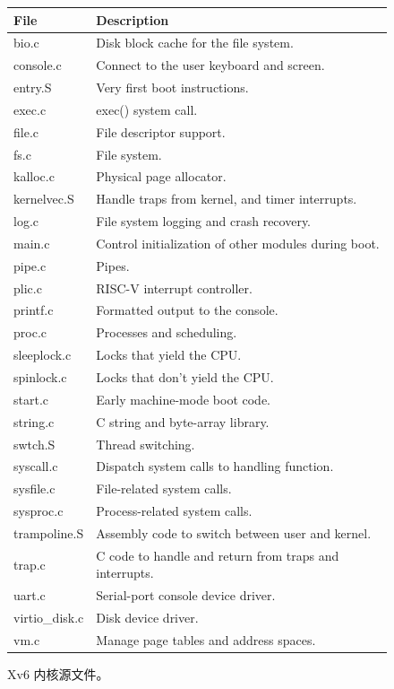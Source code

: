    \begin{figure}[t]
\center
\begin{tabular}{l|l}
{\bf File} & {\bf Description}  \\ 
\midrule bio.c & Disk block cache for the file system.  \\ console.c & Connect to the user keyboard and screen.  \\ entry.S & Very first boot instructions.  \\ exec.c & exec() system call.  \\ file.c & File descriptor support.  \\ fs.c & File system.  \\ kalloc.c & Physical page allocator.  \\ kernelvec.S & Handle traps from kernel, and timer interrupts.  \\ log.c & File system logging and crash recovery.  \\ main.c & Control initialization of other modules during boot.  \\ pipe.c & Pipes.  \\ plic.c & RISC-V interrupt controller.  \\ printf.c & Formatted output to the console.  \\ proc.c & Processes and scheduling.  \\ sleeplock.c & Locks that yield the CPU.  \\ spinlock.c & Locks that don't yield the CPU.  \\ start.c & Early machine-mode boot code.  \\ string.c & C string and byte-array library.  \\ swtch.S & Thread switching.  \\ syscall.c & Dispatch system calls to handling function.  \\ sysfile.c & File-related system calls.  \\ sysproc.c & Process-related system calls.  \\ trampoline.S & Assembly code to switch between user and kernel.  \\ trap.c & C code to handle and return from traps and interrupts.  \\ uart.c & Serial-port console device driver.  \\ virtio\_disk.c & Disk device driver.  \\ vm.c & Manage page tables and address spaces.  \\ 
\end{tabular}
\caption{Xv6 内核源文件。  }
\label{fig:source}
\end{figure}     

